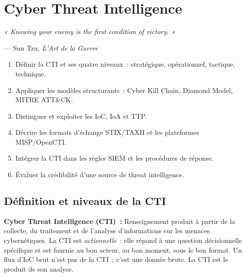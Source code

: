 \chapter{Cyber Threat Intelligence}
\label{chap:cti}

\epigraph{\itshape « Knowing your enemy is the first condition of victory. »}
         {--- Sun Tzu, \textit{L'Art de la Guerre}}

\begin{boxobjectifs}
\begin{enumerate}
  \item Définir la CTI et ses quatre niveaux~: stratégique, opérationnel,
        tactique, technique.
  \item Appliquer les modèles structurants~: Cyber Kill Chain, Diamond Model,
        MITRE ATT\&CK.
  \item Distinguer et exploiter les IoC, IoA et TTP.
  \item Décrire les formats d'échange STIX/TAXII et les plateformes
        MISP/OpenCTI.
  \item Intégrer la CTI dans les règles SIEM et les procédures de réponse.
  \item Évaluer la crédibilité d'une source de threat intelligence.
\end{enumerate}
\end{boxobjectifs}

\section{Définition et niveaux de la CTI}
\label{sec:cti-def}

\begin{boxdef}
\textbf{Cyber Threat Intelligence (CTI)~:} Renseignement produit à partir
de la collecte, du traitement et de l'analyse d'informations sur les menaces
cybernétiques. La CTI est \textit{actionnelle}~: elle répond à une question
décisionnelle spécifique et est fournie au bon acteur, au bon moment, sous
le bon format. Un flux d'IoC brut n'est pas de la CTI~; c'est une donnée
brute. La CTI est le produit de son analyse.
\end{boxdef}

